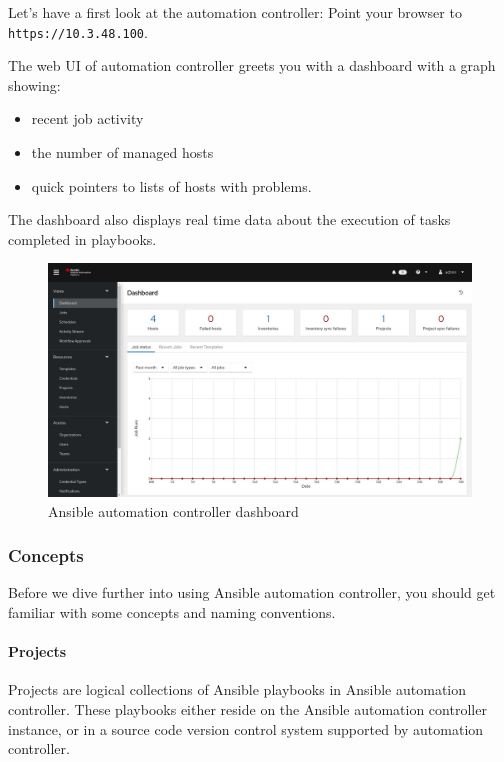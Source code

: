Let's have a first look at the automation controller: Point your browser
to \texttt{https://10.3.48.100}.

The web UI of automation controller greets you with a dashboard with a
graph showing:

\begin{itemize}
\tightlist
\item
  recent job activity
\item
  the number of managed hosts
\item
  quick pointers to lists of hosts with problems.
\end{itemize}

The dashboard also displays real time data about the execution of tasks
completed in playbooks.

\begin{figure}
\centering
\includegraphics{images/02_controller_dashboard.jpg}
\caption{Ansible automation controller dashboard}
\end{figure}

\hypertarget{concepts}{%
\subsubsection{Concepts}\label{concepts}}

Before we dive further into using Ansible automation controller, you
should get familiar with some concepts and naming conventions.

\hypertarget{projects}{%
\paragraph{Projects}\label{projects}}

Projects are logical collections of Ansible playbooks in Ansible
automation controller. These playbooks either reside on the Ansible
automation controller instance, or in a source code version control
system supported by automation controller.


